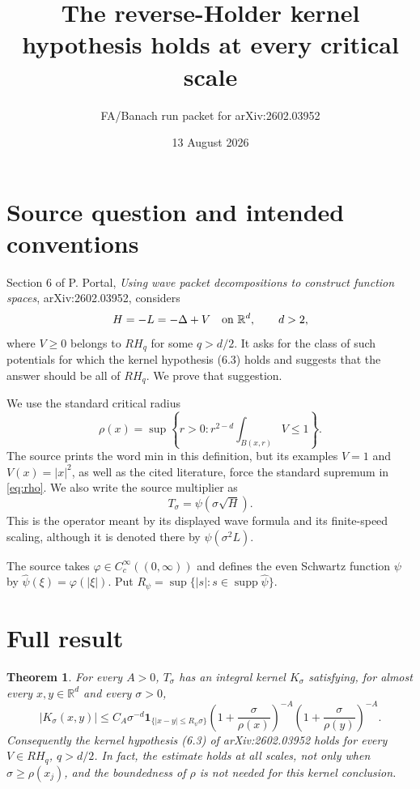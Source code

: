 \documentclass[11pt]{article}
\title{The reverse-Holder kernel hypothesis holds at every critical scale}
\author{FA/Banach run packet for arXiv:2602.03952}
\date{13 August 2026}
\newtheorem{theorem}{Theorem}
\newcommand{\R}{\mathbb R}
\newcommand{\1}{\mathbf 1}
\begin{document}
\setlength{\emergencystretch}{3em}
\maketitle

\section*{Source question and intended conventions}

Section 6 of P. Portal, \emph{Using wave packet decompositions to construct
function spaces}, arXiv:2602.03952, considers
\[
 H=-L=-\Delta+V\quad\hbox{on }\R^d,\qquad d>2,
\]
where \(V\geq0\) belongs to \(RH_q\) for some \(q>d/2\). It asks for the
class of such potentials for which the kernel hypothesis (6.3) holds and
suggests that the answer should be all of \(RH_q\). We prove that suggestion.

We use the standard critical radius
\begin{equation}\label{eq:rho}
 \rho(x)=\sup\left\{r>0:r^{2-d}\int_{B(x,r)}V\leq1\right\}.
\end{equation}
The source prints the word min in this definition, but its examples
\(V=1\) and \(V(x)=|x|^2\), as well as the cited literature, force the
standard supremum in \eqref{eq:rho}. We also write the source multiplier as
\[
 T_\sigma=\psi(\sigma\sqrt H).
\]
This is the operator meant by its displayed wave formula and its finite-speed
scaling, although it is denoted there by \(\psi(\sigma^2L)\).

The source takes \(\varphi\in C_c^\infty((0,\infty))\) and defines the even
Schwartz function \(\psi\) by
\(\widehat\psi(\xi)=\varphi(|\xi|)\). Put
\(R_\psi=\sup\{|s|:s\in\operatorname{supp}\widehat\psi\}\).

\section*{Full result}

\begin{theorem}\label{thm:main}
For every \(A>0\), \(T_\sigma\) has an integral kernel \(K_\sigma\) satisfying,
for almost every \(x,y\in\R^d\) and every \(\sigma>0\),
\begin{equation}\label{eq:strong}
 |K_\sigma(x,y)|\leq C_A\sigma^{-d}
 \1_{\{|x-y|\leq R_\psi\sigma\}}
 \left(1+\frac{\sigma}{\rho(x)}\right)^{-A}
 \left(1+\frac{\sigma}{\rho(y)}\right)^{-A}.
\end{equation}
Consequently the kernel hypothesis (6.3) of arXiv:2602.03952 holds for every
\(V\in RH_q\), \(q>d/2\). In fact, the estimate holds at all scales, not only
when \(\sigma\geq\rho(x_j)\), and the boundedness of \(\rho\) is not needed for
this kernel conclusion.
\end{theorem}
\end{document}
